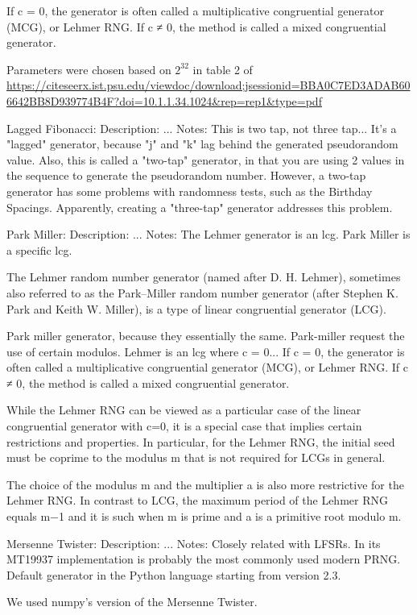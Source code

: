 \documentclass[conference]{IEEEtran}
\begin{document}
If c = 0, the generator is often called a multiplicative
congruential generator (MCG), or Lehmer RNG. If c ≠ 0, the
method is called a mixed congruential generator.

Parameters were chosen based on $2^32$ in table 2 of 
\url{https://citeseerx.ist.psu.edu/viewdoc/download;jsessionid=BBA0C7ED3ADAB606642BB8D939774B4F?doi=10.1.1.34.1024&rep=rep1&type=pdf}

Lagged Fibonacci:
Description:
...
Notes:
This is two tap, not three tap...
It's a "lagged" generator, because "j" and "k" lag behind the generated pseudorandom value. 
Also, this is called a "two-tap" generator, in that you are using 2 values in the sequence 
to generate the pseudorandom number. However, a two-tap generator has some problems with 
randomness tests, such as the Birthday Spacings. Apparently, creating a "three-tap" generator
addresses this problem.

Park Miller:
Description:
...
Notes:
The Lehmer generator is an lcg. Park Miller is a specific lcg.
    
The Lehmer random number generator (named after D. H. Lehmer), 
sometimes also referred to as the Park–Miller random number generator
(after Stephen K. Park and Keith W. Miller), is a type of linear congruential generator (LCG).

Park miller generator, because they essentially the same.
Park-miller request the use of certain modulos.
Lehmer is an lcg where c = 0...
If c = 0, the generator is often called a multiplicative congruential generator (MCG),
or Lehmer RNG. If c ≠ 0, the method is called a mixed congruential generator.

While the Lehmer RNG can be viewed as a particular case of the linear congruential generator
with c=0, it is a special case that implies certain restrictions and properties.
In particular, for the Lehmer RNG, the initial seed must be coprime to the modulus m that is
not required for LCGs in general. 

The choice of the modulus m and the multiplier a is also more restrictive for the Lehmer RNG.
In contrast to LCG, the maximum period of the Lehmer RNG equals m−1 and it is such when m is 
prime and a is a primitive root modulo m. 

Mersenne Twister:
Description:
...
Notes:
Closely related with LFSRs. In its MT19937 implementation is probably the most commonly used modern PRNG. 
Default generator in the Python language starting from version 2.3. 

We used numpy's version of the Mersenne Twister.
\end{document}
